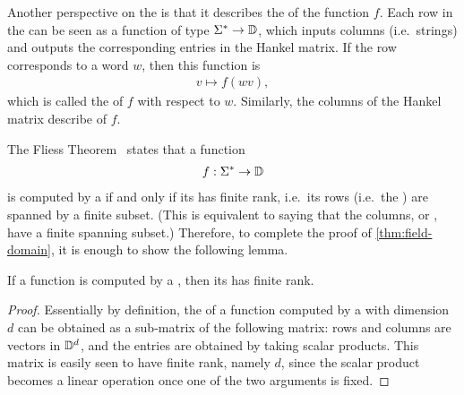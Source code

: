 Another perspective on the  is that it describes the
 of the function $f$. Each row in the  can be
seen as a function of type $\Sigma^* \to \mathbb D$, which inputs columns
(i.e.~strings) and outputs the corresponding entries in the Hankel matrix. If
the row corresponds to a word $w$, then this function is
\begin{align*}
v \mapsto f(wv),
\end{align*}
which is called the  of $f$ with respect to $w$.
Similarly, the columns of the Hankel matrix describe  of $f$.

The Fliess Theorem~\cite[Theorem 2.1.1]{fliess1974} states that a function 
\begin{align*}
f : \Sigma^* \to \mathbb D
\end{align*}
is computed by a  if and only if  its 
has finite rank, i.e.~its rows (i.e.~the ) are spanned by
a finite subset. (This is equivalent to saying that the columns, or , have a finite spanning subset.) Therefore, to complete the proof
of \cref{thm:field-domain}, it is enough to show the following lemma.

\begin{lemma}\label{lem:hankel-finite-rank}
    If a function is computed by a ,
    then its  has finite rank.
\end{lemma}
\begin{proof}
  Essentially by definition, the  of a function computed by a
   with dimension $d$ can be obtained as a
  sub-matrix of the following matrix: rows and columns are vectors in
  $\mathbb D^d$, and the entries are obtained by taking scalar products. This
  matrix is easily seen to have finite rank, namely $d$, since the scalar
  product  becomes a linear operation once one of the two arguments is fixed.
\end{proof}
